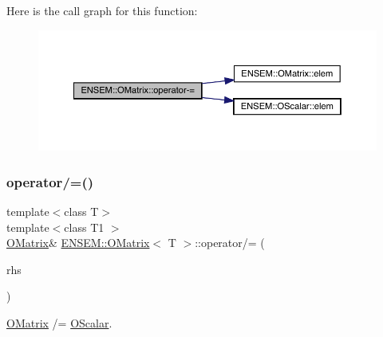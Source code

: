 Here is the call graph for this function\+:
\nopagebreak
\begin{figure}[H]
\begin{center}
\leavevmode
\includegraphics[width=350pt]{dd/d80/classENSEM_1_1OMatrix_a53a1a690a2f39f0c64c6d261efc00e4c_cgraph}
\end{center}
\end{figure}
\mbox{\label{classENSEM_1_1OMatrix_a46dc90e0e33442dcdcb9e98f9cf0025e}} 
\subsubsection{\texorpdfstring{operator/=()}{operator/=()}\hspace{0.1cm}{\footnotesize\ttfamily [1/3]}}
{\footnotesize\ttfamily template$<$class T$>$ \\
template$<$class T1 $>$ \\
\mbox{\hyperlink{classENSEM_1_1OMatrix}{O\+Matrix}}\& \mbox{\hyperlink{classENSEM_1_1OMatrix}{E\+N\+S\+E\+M\+::\+O\+Matrix}}$<$ T $>$\+::operator/= (\begin{DoxyParamCaption}\item[{const \mbox{\hyperlink{classENSEM_1_1OScalar}{O\+Scalar}}$<$ T1 $>$ \&}]{rhs }\end{DoxyParamCaption})\hspace{0.3cm}{\ttfamily [inline]}}



\mbox{\hyperlink{classENSEM_1_1OMatrix}{O\+Matrix}} /= \mbox{\hyperlink{classENSEM_1_1OScalar}{O\+Scalar}}. 


